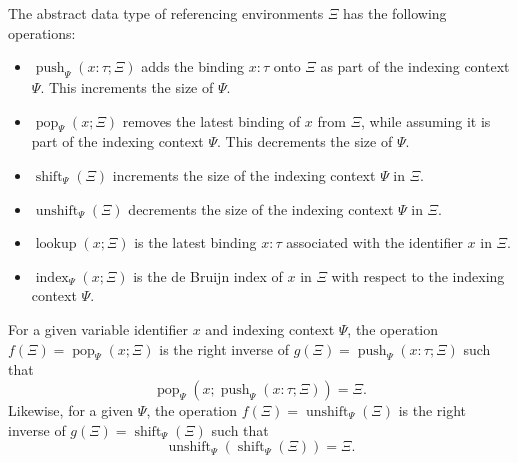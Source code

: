 \newcommand{\Hoare}[3]{\set{#1}\ #2\ \set{#3}}
\renewcommand{\Env}{\mathsf{Env}}
\renewcommand{\Pop}[3]{\operatorname{pop}_{#1}\left(#2; #3\right)}
\newcommand{\Push}[3]{\operatorname{push}_{#1}\left(#2; #3\right)}
\newcommand{\Shift}[2]{\operatorname{shift}_{#1}\left(#2\right)}
\newcommand{\Unshift}[2]{\operatorname{unshift}_{#1}\left(#2\right)}
\renewcommand{\Lookup}[2]{\operatorname{lookup}\left(#1; #2\right)}
\renewcommand{\Index}[3]{\operatorname{index}_{#1}\left(#2; #3\right)}
\newcommand{\Indexes}[3]{#1 \rightsquigarrow_{#2} #3}
\newcommand{\IndexesKind}[2]{\Indexes{#1}{{\normalfont\text{K}}}{#2}}
\newcommand{\IndexesType}[2]{\Indexes{#1}{{\normalfont\text{A}}}{#2}}
\newcommand{\IndexesTerm}[2]{\Indexes{#1}{{\normalfont\text{M}}}{#2}}
\newcommand{\LFTerm}{\mathsf{LF}_{\mathsf{term}}}
\newcommand{\LFTypeConst}{\mathsf{LF}_{\mathsf{type\ const}}}
\newcommand{\LFTermConst}{\mathsf{LF}_{\mathsf{term\ const}}}

The abstract data type of referencing environments $\Xi$ has the following operations:
\begin{itemize}
\item
$\Push{\Psi}{x : \tau}{\Xi}$ adds the binding $x : \tau$ onto $\Xi$ as part of the indexing context $\Psi$.
This increments the size of $\Psi$.
\item
$\Pop{\Psi}{x}{\Xi}$ removes the latest binding of $x$ from $\Xi$, while assuming it is part of the indexing context $\Psi$.
This decrements the size of $\Psi$.
\item
$\Shift{\Psi}{\Xi}$ increments the size of the indexing context $\Psi$ in $\Xi$.
\item
$\Unshift{\Psi}{\Xi}$ decrements the size of the indexing context $\Psi$ in $\Xi$.
\item
$\Lookup{x}{\Xi}$ is the latest binding $x : \tau$ associated with the identifier $x$ in $\Xi$.
\item
$\Index{\Psi}{x}{\Xi}$ is the de Bruijn index of $x$ in $\Xi$ with respect to the indexing context $\Psi$.
\end{itemize}
For a given variable identifier $x$ and indexing context $\Psi$, the operation $f(\Xi)=\Pop{\Psi}{x}{\Xi}$ is the right inverse of $g(\Xi)=\Push{\Psi}{x : \tau}{\Xi}$ such that
\begin{equation*}
\Pop{\Psi}{x}{\Push{\Psi}{x : \tau}{\Xi}} = \Xi.
\end{equation*}
Likewise, for a given $\Psi$, the operation $f(\Xi)=\Unshift{\Psi}{\Xi}$ is the right inverse of $g(\Xi)=\Shift{\Psi}{\Xi}$ such that
\begin{equation*}
\Unshift{\Psi}{\Shift{\Psi}{\Xi}} = \Xi.
\end{equation*}

